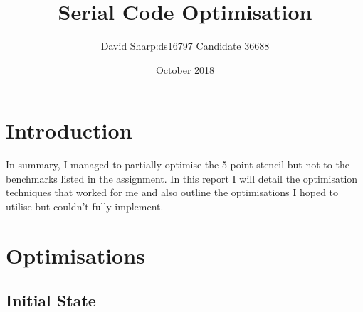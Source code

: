 \documentclass{article}
\title{Serial Code Optimisation}
\author{David Sharp:ds16797 Candidate 36688}
\date{October 2018}
\begin{document}
    \maketitle
    \section{Introduction}
    In summary, I managed to partially optimise the 5-point stencil but not to the benchmarks listed in the assignment.
    In this report I will detail the optimisation techniques that worked for me and also outline the optimisations I hoped to utilise
    but couldn't fully implement.
    \section{Optimisations}
    \subsection{Initial State}
\end{document}
